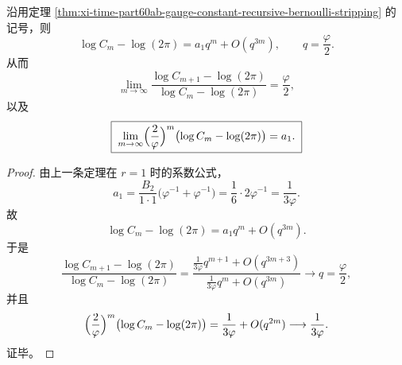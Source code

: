\begin{corollary}\label{cor:xi-time-part60ab-gauge-constant-leading-mode-ratio}
沿用定理 \ref{thm:xi-time-part60ab-gauge-constant-recursive-bernoulli-stripping} 的记号，则
\[
\boxed{\;
\log C_m-\log(2\pi)
=
a_1 q^m+O(q^{3m}),
\qquad
q=\frac{\varphi}{2}.\;}
\]
从而
\[
\boxed{\;
\lim_{m\to\infty}
\frac{\log C_{m+1}-\log(2\pi)}
{\log C_m-\log(2\pi)}
=
\frac{\varphi}{2},\;}
\]
以及
\[
\boxed{\;
\lim_{m\to\infty}
\Bigl(\frac{2}{\varphi}\Bigr)^m
\bigl(\log C_m-\log(2\pi)\bigr)
=
a_1.\;}
\]
\end{corollary}
\begin{proof}
由上一条定理在 \(r=1\) 时的系数公式，
\[
a_1=
\frac{B_2}{1\cdot 1}
\bigl(\varphi^{-1}+\varphi^{-1}\bigr)
=
\frac16\cdot 2\varphi^{-1}
=
\frac{1}{3\varphi}.
\]
故
\[
\log C_m-\log(2\pi)
=
a_1 q^m+O(q^{3m}).
\]
于是
\[
\frac{\log C_{m+1}-\log(2\pi)}
{\log C_m-\log(2\pi)}
=
\frac{\frac{1}{3\varphi}q^{m+1}+O(q^{3m+3})}
{\frac{1}{3\varphi}q^m+O(q^{3m})}
\longrightarrow q=\frac{\varphi}{2},
\]
并且
\[
\Bigl(\frac{2}{\varphi}\Bigr)^m\bigl(\log C_m-\log(2\pi)\bigr)
=
\frac{1}{3\varphi}+O(q^{2m})
\longrightarrow
\frac{1}{3\varphi}.
\]
证毕。
\end{proof}





